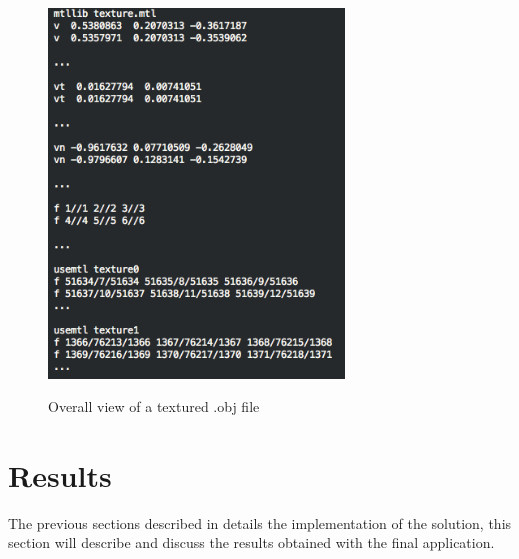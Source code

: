 \begin{figure}
\caption{Overall view of a textured .obj file}
\centering
    \includegraphics[width=0.7\textwidth]{images/texturedFileExample.png}
\label{fig:texturedFileExample}
\end{figure}

\section{Results}
\label{sec:Results}

The previous sections described in details the implementation of the solution, this section will describe and discuss the results obtained with the final application.\\

